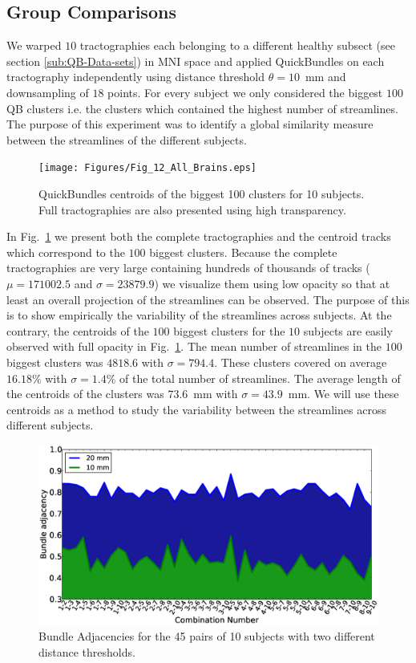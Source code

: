 \documentclass{bioinfo}
\begin{document}
\subsection{Group Comparisons \label{sub:group_comp}}

We warped $10$ tractographies each belonging to a different healthy
subsect (see section \ref{sub:QB-Data-sets}) in MNI space and applied
QuickBundles on each tractography independently using distance threshold
$\theta=10$~mm and downsampling of $18$ points. For every subject we
only considered the biggest $100$ QB clusters i.e. the clusters which
contained the highest number of streamlines. The purpose of this
experiment was to identify a global similarity measure between the
streamlines of the different subjects.

\begin{figure}[htp]
\centerline{\texttt{[image: Figures/Fig\_12\_All\_Brains.eps]}}
\caption{QuickBundles centroids of the biggest 100 clusters for 10
  subjects. Full tractographies are also presented using high
  transparency. \label{Flo:BAs}}
\end{figure}

In Fig.~\ref{Flo:BAs} we present both the complete tractographies and
the centroid tracks which correspond to the $100$ biggest
clusters. Because the complete tractographies are very large containing
hundreds of thousands of tracks ($\mu=\num{171002.5}$ and
$\sigma=\num{23879.9}$) we visualize them using low opacity so that at
least an overall projection of the streamlines can be observed. The
purpose of this is to show empirically the variability of the
streamlines across subjects. At the contrary, the centroids of the $100$
biggest clusters for the $10$ subjects are easily observed with full
opacity in Fig.~\ref{Flo:BAs}. The mean number of streamlines in the
$100$ biggest clusters was $\num{4818.6}$ with
$\sigma=\num{794.4}$. These clusters covered on average $16.18\%$ with
$\sigma=1.4\%$ of the total number of streamlines. The average length of
the centroids of the clusters was $73.6$~mm with $\sigma=43.9$~mm. We
will use these centroids as a method to study the variability between
the streamlines across different subjects.

\begin{figure}
\centerline{\includegraphics[scale=0.24]{Figures/Fig_13_BAs}}
\caption{Bundle Adjacencies for the 45 pairs of 10 subjects with two
  different distance thresholds. \label{Flo:BAs_plot}}
\end{figure}
\end{document}
